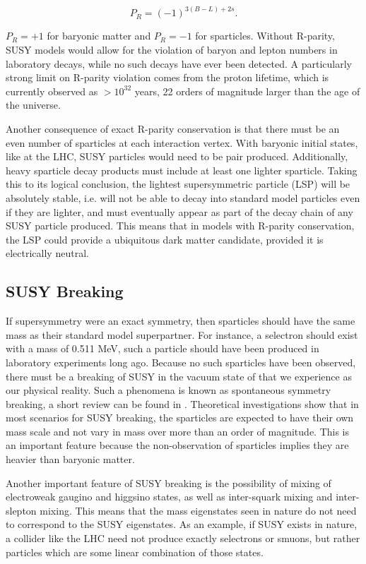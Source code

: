     \[
      P_R = (-1)^{3(B-L)+2s}.
    \]

    $P_R = +1$ for baryonic matter and $P_R = -1$ for sparticles. Without R-parity, SUSY models would allow for the violation of baryon and lepton numbers in laboratory decays, while no such decays have ever been detected. A particularly strong limit on R-parity violation comes from the proton lifetime, which is currently observed as $> 10^{32}$ years, 22 orders of magnitude larger than the age of the universe. 

    Another consequence of exact R-parity conservation is that there must be an even number of sparticles at each interaction vertex. With baryonic initial states, like at the LHC, SUSY particles would need to be pair produced. Additionally, heavy sparticle decay products must include at least one lighter sparticle. Taking this to its logical conclusion, the lightest supersymmetric particle (LSP) will be absolutely stable, i.e. will not be able to decay into standard model particles even if they are lighter, and must eventually appear as part of the decay chain of any SUSY particle produced. This means that in models with R-parity conservation, the LSP could provide a ubiquitous dark matter candidate, provided it is electrically neutral. \cite[sec. 6.2]{susy_primer}

  \subsection{SUSY Breaking}
    If supersymmetry were an exact symmetry, then sparticles should have the same mass as their standard model superpartner. For instance, a selectron should exist with a mass of 0.511 MeV, such a particle should have been produced in laboratory experiments long ago. Because no such sparticles have been observed, there must be a breaking of SUSY in the vacuum state of that we experience as our physical reality. Such a phenomena is known as spontaneous symmetry breaking, a short review can be found in \cite{symmetry_breaking}. Theoretical investigations show that in most scenarios for SUSY breaking, the sparticles are expected to have their own mass scale and not vary in mass over more than an order of magnitude. This is an important feature because the non-observation of sparticles implies they are heavier than baryonic matter. 

    Another important feature of SUSY breaking is the possibility of mixing of electroweak gaugino and higgsino states, as well as inter-squark mixing and inter-slepton mixing. This means that the mass eigenstates seen in nature do not need to correspond to the SUSY eigenstates. As an example, if SUSY exists in nature, a collider like the LHC need not produce exactly selectrons or smuons, but rather particles which are some linear combination of those states.

